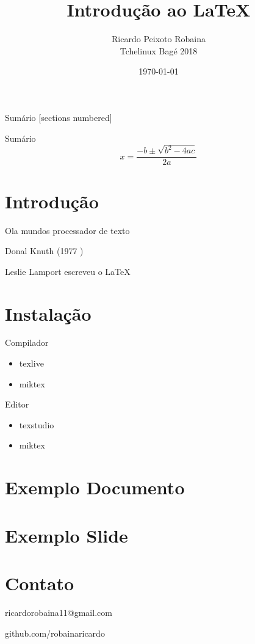 \documentclass{beamer}
\title{Introdução ao \LaTeX}
\date{\today}
\author{Ricardo Peixoto Robaina \\ Tchelinux Bagé 2018}
\institute{Universidade Federal do Pampa}
\begin{document}
	
	\begin{frame}[noframenumbering]
		\titlepage
		\thispagestyle{empty}
	\end{frame}
	
	\begin{frame}{Sumário}
		[sections numbered]
		\tableofcontents[hideallsubsections]
	\end{frame}


\begin{frame}{Sumário}
$$x=\frac{-b\pm\sqrt{b^2-4ac}}{2a}$$

\end{frame}



\section{Introdução}







\begin{frame}
	Ola mundos
	processador de texto
	
	\Tex Donal Knuth (1977
	)
	
	Leslie Lamport escreveu o \LaTeX
\end{frame}

\section{Instalação}

\begin{block}{Compilador}
	\begin{itemize}
		\item texlive
		\item miktex
	\end{itemize}
\end{block}

\begin{block}{Editor}
	\begin{itemize}
		\item texstudio
		\item miktex
	\end{itemize}
\end{block}

\section{Exemplo Documento}

\section{Exemplo Slide}

\section{Contato}

\begin{frame}
	ricardorobaina11@gmail.com
	
	github.com/robainaricardo
\end{frame}
\end{document}
